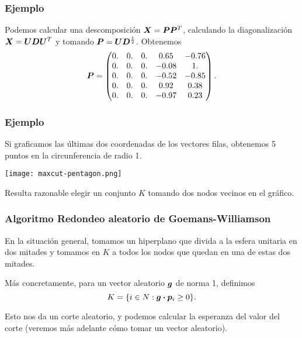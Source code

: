 \documentclass[aspectratio=169,12pt,spanish]{beamer}
\begin{document}

\begin{frame}
\frametitle{Ejemplo}

Podemos calcular una descomposición $\bm{X} = \bm{P} \bm{P}^T$, calculando la diagonalización $\bm{X} = \bm{U} \bm{D} \bm{U}^T$ y tomando $\bm{P} = \bm{U} \bm{D}^{\frac12}$.
Obtenemos
$$
\bm{P}= \begin{pmatrix}
0. &  0. &  0. &   0.65 & -0.76 \\
0. &  0. &  0. &  -0.08 &  1.   \\
0. &  0. &  0. &  -0.52 & -0.85 \\
0. &  0. &  0. &   0.92 &  0.38 \\
0. &  0. &  0. &  -0.97 &  0.23
\end{pmatrix}.
$$

\end{frame}


\begin{frame}
\frametitle{Ejemplo}

Si graficamos las últimas dos coordenadas de los vectores filas, obtenemos 5 puntos en la circunferencia de radio 1.

\begin{center}
\texttt{[image: maxcut-pentagon.png]}
\end{center}

Resulta razonable elegir un conjunto $K$ tomando dos nodos vecinos en el gráfico.

\end{frame}


\begin{frame}
\frametitle{Algoritmo Redondeo aleatorio de Goemans-Williamson}

En la situación general, tomamos un hiperplano que divida a la esfera unitaria en dos mitades y tomamos en $K$ a todos los nodos que quedan en una de estas dos mitades.

Más concretamente, para un vector aleatorio $\bm{g}$ de norma 1, definimos
$$
K = \{i \in N: \bm{g} \boldsymbol{\cdot} \bm{p}_i \ge 0\}.
$$

Esto nos da un corte aleatorio, y podemos calcular la esperanza  del valor del corte (veremos más adelante cómo tomar un vector aleatorio).

\end{frame}
\end{document}
